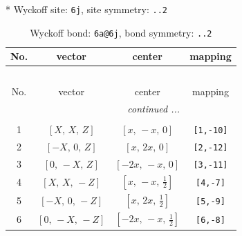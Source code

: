 \documentclass[fleqn,8pt]{jsarticle}
\begin{document}
* Wyckoff site: {\tt 6j}, site symmetry: {\tt ..2}
\renewcommand{\arraystretch}{1.2}
\begin{longtable}{cccc}
\caption{Wyckoff bond: {\tt 6a@6j}, bond symmetry: {\tt ..2}}
 \\
 \hline \hline
No. & vector & center & mapping \\ \hline \endfirsthead

\multicolumn{3}{l}{\tablename\ \thetable{}} \\
 \hline \hline
No. & vector & center & mapping \\ \hline \endhead

 \hline \hline
\multicolumn{3}{r}{\footnotesize\it continued ...} \\ \endfoot

 \hline \hline
\multicolumn{3}{r}{} \\ \endlastfoot

1 & $\left[ X,\, X,\, Z \right]$ & $\left[ x,\, - x,\, 0 \right]$ & {\tt [1,-10]} \\ \hline
2 & $\left[ - X,\, 0,\, Z \right]$ & $\left[ x,\, 2 x,\, 0 \right]$ & {\tt [2,-12]} \\ \hline
3 & $\left[ 0,\, - X,\, Z \right]$ & $\left[ - 2 x,\, - x,\, 0 \right]$ & {\tt [3,-11]} \\ \hline
4 & $\left[ X,\, X,\, - Z \right]$ & $\left[ x,\, - x,\, \frac{1}{2} \right]$ & {\tt [4,-7]} \\ \hline
5 & $\left[ - X,\, 0,\, - Z \right]$ & $\left[ x,\, 2 x,\, \frac{1}{2} \right]$ & {\tt [5,-9]} \\ \hline
6 & $\left[ 0,\, - X,\, - Z \right]$ & $\left[ - 2 x,\, - x,\, \frac{1}{2} \right]$ & {\tt [6,-8]} \\
\end{longtable}
\renewcommand{\arraystretch}{1.2}
\end{document}
